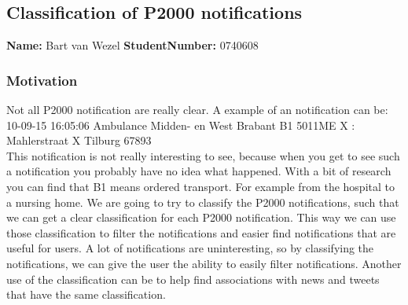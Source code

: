 \subsection{Classification of P2000 notifications }
\textbf{Name:} Bart van Wezel \indent \textbf{StudentNumber:} 0740608

\subsubsection*{Motivation}
Not all P2000 notification are really clear. A example of an notification can be: \\ 
10-09-15	16:05:06	Ambulance	Midden- en West Brabant	B1 5011ME X : Mahlerstraat X Tilburg 67893  \\
This notification is not really interesting to see, because when you get to see such a notification you probably have no idea what happened. 
With a bit of research you can find that B1 means ordered transport. For example from the hospital to a nursing home. 
We are going to try to classify the P2000 notifications, such that we can get a clear classification for each P2000 notification.
This way we can use those classification to filter the notifications and easier find notifications that are useful for users. 
A lot of notifications are uninteresting, so by classifying the notifications, we can give the user the ability to easily filter notifications.
Another use of the classification can be to help find associations with news and tweets that have the same classification.


